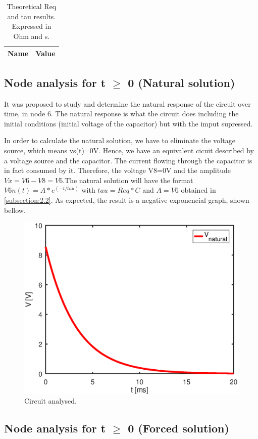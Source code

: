 \begin{table}[ht]
  \centering
  \begin{tabular}{|l|r|}
    \hline    
    {\bf Name} & {\bf Value} \\ \hline
    
  \end{tabular}
  \caption{Theoretical Req and tau results. Expressed in Ohm and s.}
  \label{tab:p2}
\end{table}

\subsection{Node analysis for t $\ge$ 0 (Natural solution)}


It was proposed to study and determine the natural response of the circuit over time, in node 6. The natural response is what the circuit does including the initial conditions (initial voltage of the capacitor) but with the imput supressed. 

In order to calculate the natural solution, we have to eliminate the voltage source, which means vs(t)=0V. Hence, we have an equivalent cicuit described by a voltage source and the capacitor. The current flowing through the capacitor is in fact consumed by it. Therefore, the voltage V8=0V and the amplitude $Vx=V6-V8=V6$.The natural solution will have the format $V{6n}(t)=A*e^{(-t/tau)}$ with $tau=Req*C$ and $A=V6$ obtained in \ref{subsection:2.2}. As expected, the result is a negative exponencial graph, shown bellow.

\begin{figure}[ht] \centering
\includegraphics[width=0.5\linewidth]{natural.eps}
\caption{Circuit analysed.}
\label{fig:sim3}
\end{figure}



\subsection{Node analysis for t $\ge$ 0 (Forced solution)}

